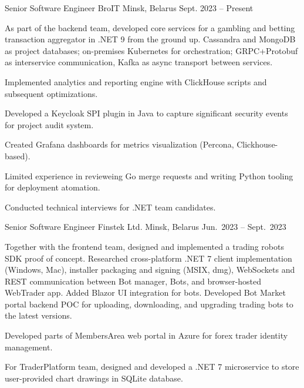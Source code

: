 

\begin{cventries}

  \cventry
    {Senior Software Engineer} %
    {BroIT} %
    {Minsk, Belarus} %
    {Sept. 2023 -- Present} %
    {
      \begin{cvitems} %
        \item {As part of the backend team, developed core services for a gambling and betting transaction aggregator in .NET 9 from the ground up. Cassandra and MongoDB as project databases; on-premises Kubernetes for orchestration; GRPC+Protobuf as interservice communication, Kafka as async transport between services.}
        \item {Implemented analytics and reporting engine with ClickHouse scripts and subsequent optimizations.}
        \item {Developed a Keycloak SPI plugin in Java to capture significant security events for project audit system.}
        \item {Created Grafana dashboards for metrics visualization (Percona, Clickhouse-based).}
        \item {Limited experience in revieweing Go merge requests and writing Python tooling for deployment atomation.}
        \item {Conducted technical interviews for .NET team candidates.}
      \end{cvitems}
    }

  \cventry
    {Senior Software Engineer} %
    {Finstek Ltd.} %
    {Minsk, Belarus} %
    {Jun.\ 2023 -- Sept.\ 2023} %
    {
      \begin{cvitems} %
        \item {Together with the frontend team, designed and implemented a trading robots SDK proof of concept. Researched cross-platform .NET 7 client implementation (Windows, Mac), installer packaging and signing (MSIX, dmg), WebSockets and REST communication between Bot manager, Bots, and browser-hosted WebTrader app. Added Blazor UI integration for bots. Developed Bot Market portal backend POC for uploading, downloading, and upgrading trading bots to the latest versions.}
        \item {Developed parts of MembersArea web portal in Azure for forex trader identity management.}
        \item {For TraderPlatform team, designed and developed a .NET 7 microservice to store user-provided chart drawings in SQLite database.}
      \end{cvitems}
    }


\end{cventries}
